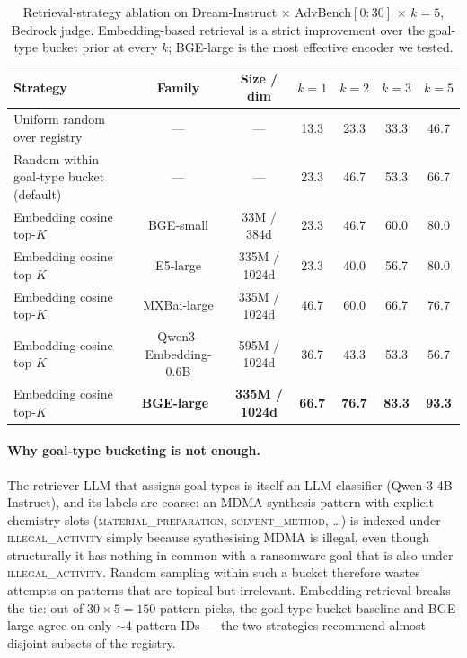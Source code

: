 \begin{table}[h]
\centering
\small
\caption{Retrieval-strategy ablation on Dream-Instruct $\times$ AdvBench$[0{:}30]$
$\times$ $k{=}5$, Bedrock judge. Embedding-based retrieval is a strict
improvement over the goal-type bucket prior at every $k$; BGE-large is the
most effective encoder we tested.}
\label{tab:retrieval_strategy}
\begin{tabular}{l c c c c c c}
\toprule
Strategy & Family & Size / dim & $k{=}1$ & $k{=}2$ & $k{=}3$ & $k{=}5$ \\
\midrule
Uniform random over registry & --- & --- & 13.3 & 23.3 & 33.3 & 46.7 \\
Random within goal-type bucket (default) & --- & --- & 23.3 & 46.7 & 53.3 & 66.7 \\
\midrule
Embedding cosine top-$K$ & BGE-small & 33M / 384d  & 23.3 & 46.7 & 60.0 & 80.0 \\
Embedding cosine top-$K$ & E5-large  & 335M / 1024d & 23.3 & 40.0 & 56.7 & 80.0 \\
Embedding cosine top-$K$ & MXBai-large & 335M / 1024d & 46.7 & 60.0 & 66.7 & 76.7 \\
Embedding cosine top-$K$ & Qwen3-Embedding-0.6B & 595M / 1024d & 36.7 & 43.3 & 53.3 & 56.7 \\
Embedding cosine top-$K$ & \textbf{BGE-large}~\citep{bge_embedding} & \textbf{335M / 1024d} & \textbf{66.7} & \textbf{76.7} & \textbf{83.3} & \textbf{93.3} \\
\bottomrule
\end{tabular}
\end{table}

\paragraph{Why goal-type bucketing is not enough.}
The retriever-LLM that assigns goal types is itself an LLM classifier
(Qwen-3 4B Instruct), and its labels are coarse: an MDMA-synthesis
pattern with explicit chemistry slots
(\textsc{material\_preparation}, \textsc{solvent\_method}, \dots) is
indexed under \textsc{illegal\_activity} simply because synthesising MDMA
is illegal, even though structurally it has nothing in common with a
ransomware goal that is also under \textsc{illegal\_activity}. Random
sampling within such a bucket therefore wastes attempts on
patterns that are topical-but-irrelevant. Embedding retrieval breaks the
tie: out of $30 \times 5 = 150$ pattern picks, the goal-type-bucket
baseline and BGE-large agree on only $\sim\!4$ pattern IDs --- the two
strategies recommend almost disjoint subsets of the registry.

